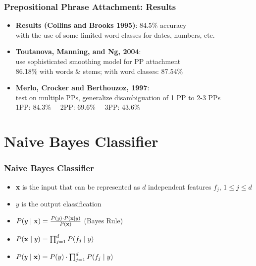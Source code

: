 \begin{frame}
\frametitle{Prepositional Phrase Attachment: Results}
  \begin{itemize}[<+->]
  \item {\bf Results (Collins and Brooks 1995)}: 84.5\% accuracy \\
  with the use of some limited word classes for dates, numbers, etc.
  \item {\bf Toutanova, Manning, and Ng, 2004}: \\
use sophisticated smoothing model for PP attachment\\
86.18\% with words \& stems; with word classes: 87.54\%
  \item {\bf Merlo, Crocker and Berthouzoz, 1997}:\\
 test on multiple PPs, generalize disambiguation of 1 PP to 2-3 PPs\\
1PP: 84.3\% \ \ 2PP: 69.6\% \ \ 3PP: 43.6\% \\
  \end{itemize}
\end{frame}


\section{Naive Bayes Classifier}
\frame{\tableofcontents[currentsection]}

\begin{frame}
\frametitle{Naive Bayes Classifier}
\begin{itemize}[<+->]
\item \textbf{x} is the input that can be represented as $d$ independent features $f_j$, $1 \leq j \leq d$
\item $y$ is the output classification
\item $P(y \mid {\bf x}) = \frac{P(y) \cdot P({\bf x} \mid y)}{P({\bf x})}$ (Bayes Rule)
\item $P({\bf x} \mid y) = \prod_{j=1}^{d} P(f_j  \mid y)$
\item $P(y \mid {\bf x}) = P(y) \cdot  \prod_{j=1}^{d} P(f_j  \mid y)$
\end{itemize}
\end{frame}


